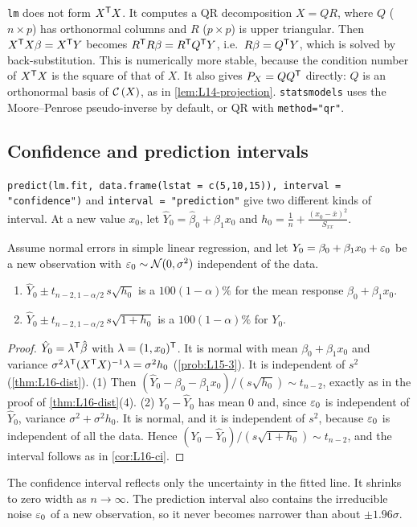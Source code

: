 \begin{note}
\texttt{lm} does not form $X^{\mathsf T} X$. It computes a QR decomposition $X=QR$, where $Q$ ($n\times p$) has orthonormal columns
and $R$ ($p\times p$) is upper triangular. Then $X^{\mathsf T} X\beta=X^{\mathsf T} Y$ becomes $R^{\mathsf T} R\beta=R^{\mathsf T} Q^{\mathsf T} Y$, i.e.\ $R\beta=Q^{\mathsf T} Y$,
which is solved by back-substitution. This is numerically more stable, because the condition number of $X^{\mathsf T} X$ is the
square of that of $X$. It also gives $P_X=QQ^{\mathsf T}$ directly: $Q$ is an orthonormal basis of $\mathcal{C}\left(X\right)$, as in
\cref{lem:L14-projection}. \texttt{statsmodels} uses the Moore--Penrose pseudo-inverse by default, or QR with
\texttt{method="qr"}.
\end{note}

\subsection{Confidence and prediction intervals}
\texttt{predict(lm.fit, data.frame(lstat = c(5,10,15)), interval = "confidence")} and
\texttt{interval = "prediction"} give two different kinds of interval. At a new value $x_0$, let
$\hat Y_0=\hat\beta_0+\hat\beta_1x_0$ and $h_0=\frac1n+\frac{(x_0-\bar x)^2}{S_{xx}}$.

\begin{proposition}\label{prop:L18-intervals}
Assume normal errors in simple linear regression, and let $Y_0=\beta_0+\beta_1x_0+\varepsilon_0$ be a new observation with
$\varepsilon_0\sim\mathcal N(0,\sigma^2)$ independent of the data.
\begin{enumerate}
  \item $\hat Y_0\pm t_{n-2,1-\alpha/2}\,s\sqrt{h_0}$ is a $100(1-\alpha)\%$  for the mean response $\beta_0+\beta_1x_0$.
  \item $\hat Y_0\pm t_{n-2,1-\alpha/2}\,s\sqrt{1+h_0}$ is a $100(1-\alpha)\%$  for $Y_0$.
\end{enumerate}
\end{proposition}
\begin{proof}
$\hat Y_0=\lambda^{\mathsf T}\hat\beta$ with $\lambda=(1,x_0)^{\mathsf T}$. It is normal with mean $\beta_0+\beta_1x_0$ and variance
$\sigma^2\lambda^{\mathsf T}(X^{\mathsf T} X)^{-1}\lambda=\sigma^2h_0$ (\cref{prob:L15-3}). It is independent of $s^2$ (\cref{thm:L16-dist}).
(1) Then $(\hat Y_0-\beta_0-\beta_1x_0)/(s\sqrt{h_0})\sim t_{n-2}$, exactly as in the proof of \cref{thm:L16-dist}(4).
(2) $Y_0-\hat Y_0$ has mean $0$ and, since $\varepsilon_0$ is independent of $\hat Y_0$, variance $\sigma^2+\sigma^2h_0$. It is
normal, and it is independent of $s^2$, because $\varepsilon_0$ is independent of all the data. Hence
$(Y_0-\hat Y_0)/(s\sqrt{1+h_0})\sim t_{n-2}$, and the interval follows as in \cref{cor:L16-ci}.
\end{proof}
The confidence interval reflects only the uncertainty in the fitted line. It shrinks to zero width as
$n\to\infty$. The prediction interval also contains the irreducible noise $\varepsilon_0$ of a new observation, so it never
becomes narrower than about $\pm1.96\sigma$.

